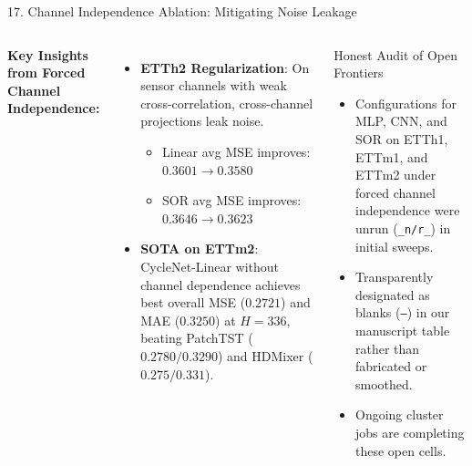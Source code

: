 \documentclass[aspectratio=169, 10pt]{beamer}
\begin{document}
\begin{frame}{17. Channel Independence Ablation: Mitigating Noise Leakage}
\begin{columns}[T]
\textbf{Key Insights from Forced Channel Independence:}
\begin{itemize}
    \item \textbf{ETTh2 Regularization}: On sensor channels with weak cross-correlation, cross-channel projections leak noise.
    \begin{itemize}
        \item Linear avg MSE improves: $0.3601 \to \mathbf{0.3580}$
        \item SOR avg MSE improves: $0.3646 \to \mathbf{0.3623}$
    \end{itemize}
    \item \textbf{SOTA on ETTm2}: CycleNet-Linear without channel dependence achieves best overall MSE ($\mathbf{0.2721}$) and MAE ($\mathbf{0.3250}$) at $H=336$, beating PatchTST ($0.2780/0.3290$) and HDMixer ($0.275/0.331$).
\end{itemize}

\begin{block}{Honest Audit of Open Frontiers}
\begin{itemize}
    \item Configurations for MLP, CNN, and SOR on ETTh1, ETTm1, and ETTm2 under forced channel independence were unrun (\texttt{\_n/r\_}) in initial sweeps.
    \item Transparently designated as blanks (\texttt{--}) in our manuscript table rather than fabricated or smoothed.
    \item Ongoing cluster jobs are completing these open cells.
\end{itemize}
\end{block}
\end{columns}
\end{frame}
\end{document}
